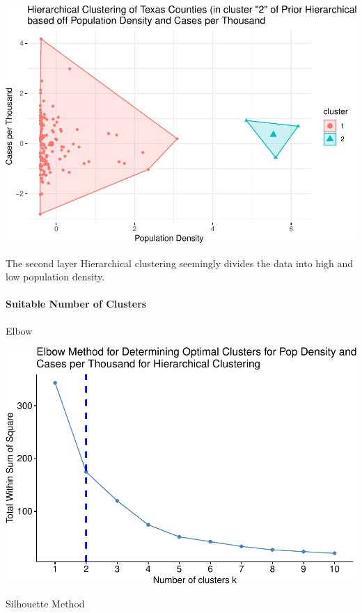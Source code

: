 \documentclass[
]{article}
\begin{document}
\includegraphics{Final-Report_files/figure-latex/unnamed-chunk-18-1.pdf}

The second layer Hierarchical clustering seemingly divides the data into
high and low population density.

\paragraph{Suitable Number of
Clusters}\label{suitable-number-of-clusters-3}

Elbow

\includegraphics{Final-Report_files/figure-latex/unnamed-chunk-19-1.pdf}

Silhouette Method
\end{document}
